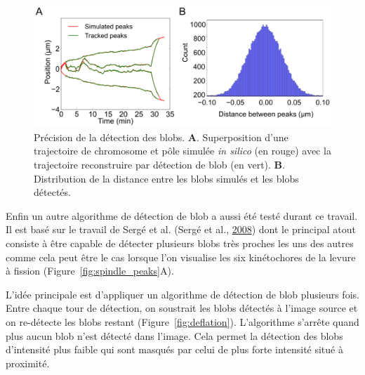 \documentclass[12pt,a4paper,twoside,openright]{book}
\begin{document}
\begin{figure}[htbp]
\centering
\includegraphics{figures/results/imaging/detection_precision.png}
\caption[Précision de la détection des blobs]{\label{fig:detection_precision}Précision
de la détection des blobs. \textbf{A}. Superposition d'une trajectoire
de chromosome et pôle simulée \emph{in silico} (en rouge) avec la
trajectoire reconstruire par détection de blob (en vert). \textbf{B}.
Distribution de la distance entre les blobs simulés et les blobs
détectés.}
\end{figure}

Enfin un autre algorithme de détection de blob a aussi été testé durant
ce travail. Il est basé sur le travail de Sergé et al. (Sergé et al.,
\hyperref[ref-Serge2008]{2008}) dont le principal atout consiste à être
capable de détecter plusieurs blobs très proches les uns des autres
comme cela peut être le cas lorsque l'on visualise les six kinétochores
de la levure à fission (Figure~\ref{fig:spindle_peaks}A).

L'idée principale est d'appliquer un algorithme de détection de blob
plusieurs fois. Entre chaque tour de détection, on soustrait les blobs
détectés à l'image source et on re-détecte les blobs restant
(Figure~\ref{fig:deflation}). L'algorithme s'arrête quand plus aucun
blob n'est détecté dans l'image. Cela permet la détection des blobs
d'intensité plus faible qui sont masqués par celui de plus forte
intensité situé à proximité.
\end{document}

